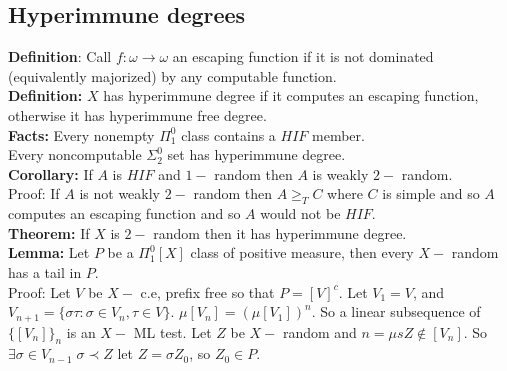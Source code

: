\documentclass{article}
\begin{document}
      \subsection{Hyperimmune degrees}
      \textbf{Definition}: Call $f : \omega \to \omega$ an escaping function if it is not dominated (equivalently majorized) by any computable function.\\
      \textbf{Definition:} $X$ has hyperimmune degree if it computes an escaping function, otherwise it has hyperimmune free degree.\\
      \textbf{Facts:} Every nonempty $\Pi^0_1$ class contains a $HIF$ member.\\
      Every noncomputable $\Sigma^0_2$ set has hyperimmune degree.\\
      \textbf{Corollary:} If $A$ is $HIF$ and $1-$ random then $A$ is weakly $2-$ random.\\
      Proof: If $A$ is not weakly $2-$ random then $A \geq_T C$ where $C$ is simple and so $A$ computes an escaping function and so $A$ would not be $HIF$.\\
      \textbf{Theorem:} If $X$ is $2-$ random then it has hyperimmune degree.\\
      \textbf{Lemma:} Let $P$ be a $\Pi^0_1[X]$ class of positive measure, then every $X-$ random has a tail in $P$.\\
      Proof: Let $V$ be $X-$ c.e, prefix free so that $P = [V]^c$. Let $V_1 = V$, and $V_{n+1} = \{\sigma\tau : \sigma \in V_n, \tau \in V\}$. $\mu[V_n] = (\mu[V_1])^n$. So a linear subsequence of $\{[V_n]\}_n$ is an $X-$ ML test. Let $Z$ be $X-$ random and $n = \mu s Z \not \in [V_n]$. So $\exists \sigma \in V_{n-1}\; \sigma \prec Z$ let $Z = \sigma Z_0$, so $Z_0 \in P$. 
\end{document}
